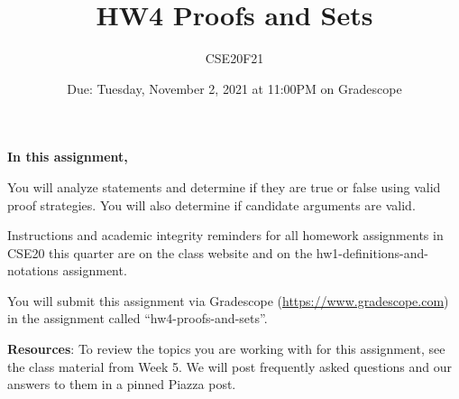 \documentclass[12pt, oneside]{article}
\author{CSE20F21}
\title{HW4 Proofs and Sets}
\date{Due: Tuesday, November 2, 2021 at 11:00PM on Gradescope}
\begin{document}
\maketitle
\thispagestyle{fancy}

{\bf In this assignment,}

You will analyze statements and determine if they are true or false using valid proof strategies.
You will also determine if candidate arguments are valid.

Instructions and academic integrity reminders for all homework assignments in 
CSE20 this quarter are on the class website and on the hw1-definitions-and-notations
assignment.

You will submit this assignment via Gradescope
(\href{https://www.gradescope.com}{https://www.gradescope.com}) 
in the assignment called ``hw4-proofs-and-sets''.

{\bf Resources}: To review the topics you are working with 
for this assignment, see the class material from Week 5.
We will post frequently asked questions and our answers to them in a 
pinned Piazza post.
\end{document}

